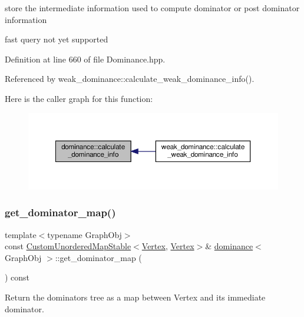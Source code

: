 store the intermediate information used to compute dominator or post dominator information

fast query not yet supported 

Definition at line 660 of file Dominance.\+hpp.



Referenced by weak\+\_\+dominance\+::calculate\+\_\+weak\+\_\+dominance\+\_\+info().

Here is the caller graph for this function\+:
\nopagebreak
\begin{figure}[H]
\begin{center}
\leavevmode
\includegraphics[width=350pt]{d1/d93/classdominance_aa440a4fa5c2acfd83163152f5063465b_icgraph}
\end{center}
\end{figure}
\mbox{\label{classdominance_a60e3d1d880582bd53ae784da18a9a3ff}} 
\subsubsection{\texorpdfstring{get\+\_\+dominator\+\_\+map()}{get\_dominator\_map()}}
{\footnotesize\ttfamily template$<$typename Graph\+Obj$>$ \\
const \hyperlink{custom__map_8hpp_a7314a7df1cdb3a3acf478ab86e95c226}{Custom\+Unordered\+Map\+Stable}$<$\hyperlink{classdominance_acc73faf26e73171b15fd0ff6c63ca393}{Vertex}, \hyperlink{classdominance_acc73faf26e73171b15fd0ff6c63ca393}{Vertex}$>$\& \hyperlink{classdominance}{dominance}$<$ Graph\+Obj $>$\+::get\+\_\+dominator\+\_\+map (\begin{DoxyParamCaption}{ }\end{DoxyParamCaption}) const\hspace{0.3cm}{\ttfamily [inline]}}



Return the dominators tree as a map between Vertex and its immediate dominator. 



